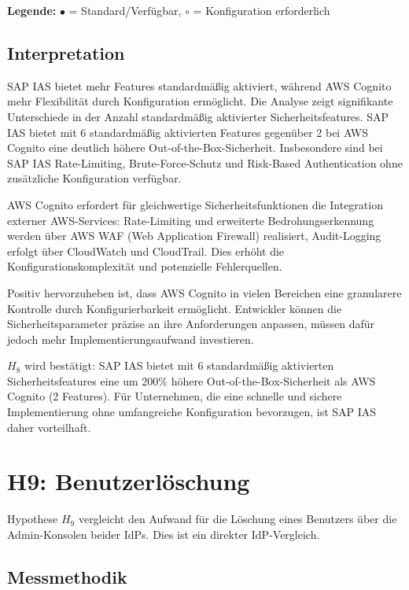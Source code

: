 \textbf{Legende:} $\bullet$ = Standard/Verfügbar, $\circ$ = Konfiguration erforderlich

\subsection{Interpretation}

\ac{SAP IAS} bietet mehr Features standardmäßig aktiviert, während \ac{AWS} Cognito mehr Flexibilität durch Konfiguration ermöglicht.
Die Analyse zeigt signifikante Unterschiede in der Anzahl standardmäßig aktivierter Sicherheitsfeatures. \ac{SAP IAS} bietet mit 6 standardmäßig aktivierten Features gegenüber 2 bei \ac{AWS} Cognito eine deutlich höhere Out-of-the-Box-Sicherheit. Insbesondere sind bei \ac{SAP IAS} Rate-Limiting, Brute-Force-Schutz und Risk-Based Authentication ohne zusätzliche Konfiguration verfügbar.

\ac{AWS} Cognito erfordert für gleichwertige Sicherheitsfunktionen die Integration externer AWS-Services: Rate-Limiting und erweiterte Bedrohungserkennung werden über AWS WAF (Web Application Firewall) realisiert, Audit-Logging erfolgt über CloudWatch und CloudTrail. Dies erhöht die Konfigurationskomplexität und potenzielle Fehlerquellen.

Positiv hervorzuheben ist, dass \ac{AWS} Cognito in vielen Bereichen eine granularere Kontrolle durch Konfigurierbarkeit ermöglicht. Entwickler können die Sicherheitsparameter präzise an ihre Anforderungen anpassen, müssen dafür jedoch mehr Implementierungsaufwand investieren.

$H_8$ wird bestätigt: \ac{SAP IAS} bietet mit 6 standardmäßig aktivierten Sicherheitsfeatures eine um 200\% höhere Out-of-the-Box-Sicherheit als \ac{AWS} Cognito (2 Features). Für Unternehmen, die eine schnelle und sichere Implementierung ohne umfangreiche Konfiguration bevorzugen, ist \ac{SAP IAS} daher vorteilhaft.


\section{H9: Benutzerlöschung}

Hypothese $H_9$ vergleicht den Aufwand für die Löschung eines Benutzers über
die Admin-Konsolen beider \ac{IdP}s. Dies ist ein direkter \ac{IdP}-Vergleich.

\subsection{Messmethodik}

